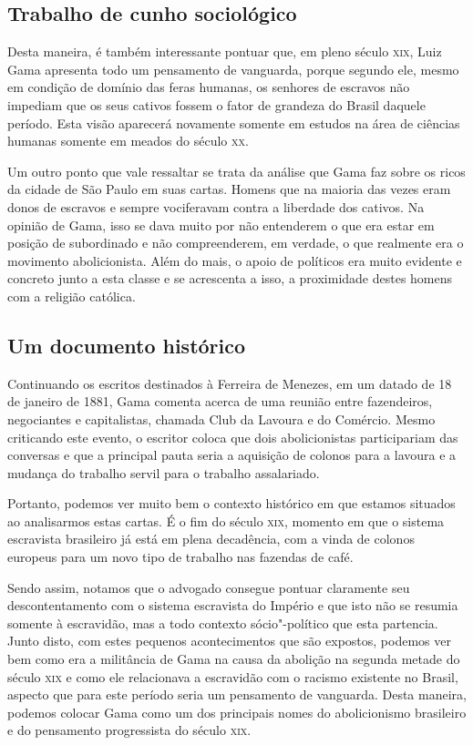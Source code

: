 \documentclass[12pt]{extarticle}
\begin{document}
\subsection{Trabalho de cunho sociológico}

Desta maneira, é também interessante pontuar que, em pleno século \textsc{xix},
Luiz Gama apresenta todo um pensamento de vanguarda, porque segundo ele,
mesmo em condição de domínio das feras humanas, os senhores de escravos
não impediam que os seus cativos fossem o fator de grandeza do Brasil
daquele período. Esta visão aparecerá novamente somente em estudos na
área de ciências humanas somente em meados do século \textsc{xx}.

Um outro ponto que vale ressaltar se trata da análise que Gama faz sobre
os ricos da cidade de São Paulo em suas cartas. Homens que na maioria
das vezes eram donos de escravos e sempre vociferavam contra a liberdade
dos cativos. Na opinião de Gama, isso se dava muito por não entenderem o
que era estar em posição de subordinado e não compreenderem, em verdade,
o que realmente era o movimento abolicionista. Além do mais, o apoio de
políticos era muito evidente e concreto junto a esta classe e se
acrescenta a isso, a proximidade destes homens com a religião católica.

\subsection{Um documento histórico}

Continuando os escritos destinados à Ferreira de Menezes, em um datado
de 18 de janeiro de 1881, Gama comenta acerca de uma reunião entre
fazendeiros, negociantes e capitalistas, chamada Club da Lavoura e do
Comércio. Mesmo criticando este evento, o escritor coloca que dois
abolicionistas participariam das conversas e que a principal pauta seria
a aquisição de colonos para a lavoura e a mudança do trabalho servil
para o trabalho assalariado.

Portanto, podemos ver muito bem o contexto histórico em que estamos
situados ao analisarmos estas cartas. É o fim do século \textsc{xix}, momento em
que o sistema escravista brasileiro já está em plena decadência, com a
vinda de colonos europeus para um novo tipo de trabalho nas fazendas de
café.

Sendo assim, notamos que o advogado consegue pontuar claramente seu
descontentamento com o sistema escravista do Império e que isto não se
resumia somente à escravidão, mas a todo contexto sócio"-político que
esta partencia. Junto disto, com estes pequenos acontecimentos que são
expostos, podemos ver bem como era a militância de Gama na causa da
abolição na segunda metade do século \textsc{xix} e como ele relacionava a
escravidão com o racismo existente no Brasil, aspecto que para este
período seria um pensamento de vanguarda. Desta maneira, podemos colocar
Gama como um dos principais nomes do abolicionismo brasileiro e do
pensamento progressista do século \textsc{xix}.
\end{document}
